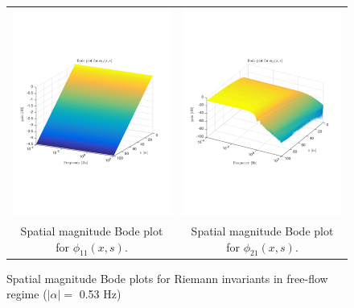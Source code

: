 \documentclass[preprint]{elsarticle}
\begin{document}
\begin{figure}
\centering
\begin{tabular}{cc}
\includegraphics[trim = 0mm 60mm 0mm 60mm, width = 8cm]{distr_phi_11}
&
\includegraphics[trim = 0mm 60mm 0mm 60mm, width = 8cm]{distr_phi_21}
\tabularnewline
Spatial magnitude Bode plot for $\phi_{11}(x,s)$.
&
Spatial magnitude Bode plot for $\phi_{21}(x,s)$.
\tabularnewline
\end{tabular}
\caption{Spatial magnitude Bode plots for Riemann invariants in free-flow regime ($\left|\alpha\right| = $ 0.53 Hz)\label{fig:Magn_spatial_diag}}
\end{figure}
\end{document}
